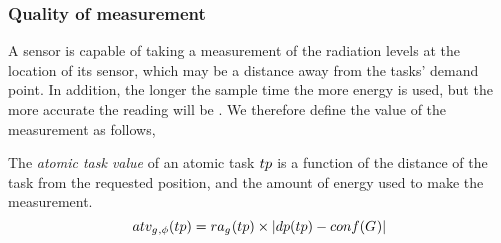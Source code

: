 \newcommand{\functionAtomicTaskQualitySignature}[2]{
	\functionSignature{atv_{\varAgent{}{}, \varTime{}{}}} {\varAtomicTask{}{}}
}
\newcommand{\functionCompositeTaskQuality}[2]{
	\functionSignature{ctv}{\varCompositeTask{}{}}
}
\subsubsection*{Quality of measurement}

A sensor is capable of taking a measurement of the radiation levels at the location of its sensor, which may be a distance away from the tasks' demand point. In addition, the longer the sample time the more energy is used, but the more accurate the reading will be \cite{dummy}. We therefore define the value of the measurement as follows,
\begin{definition}
	The \textit{atomic task value} of an atomic task $\varAtomicTask{}{}$ is a function of the distance of the task from the requested position, and the amount of energy used to make the measurement.
	\begin{equation}
		\functionAtomicTaskQualitySignature{}{} = \functionTaskResourceAllocation{}{} \times \funcSize{
				\functionTaskDemandPoint{}{} - \functionDeployment{}{}
		}{}
	\end{equation}
\end{definition}

